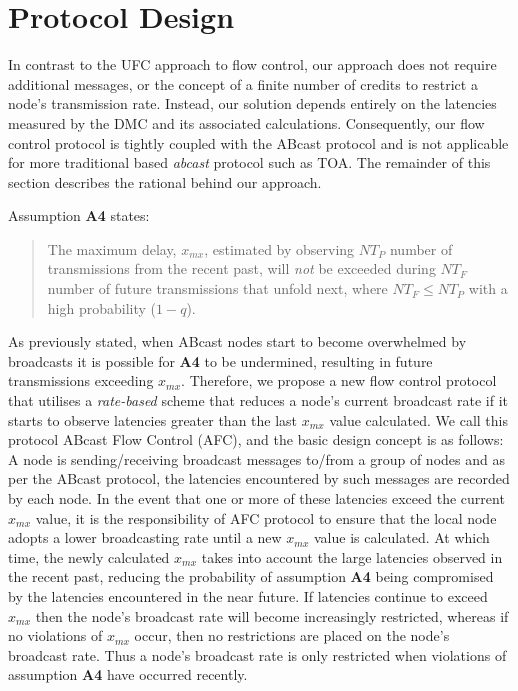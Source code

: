 \section{Protocol Design}\label{sec:afc_protocol}
    In contrast to the \textsf{UFC} approach to flow control, our approach does not require additional messages, or the concept of a finite number of credits to restrict a node's transmission rate.  Instead, our solution depends entirely on the latencies measured by the DMC and its associated calculations.  Consequently, our flow control protocol is tightly coupled with the \textsf{ABcast} protocol and is not applicable for more traditional based \emph{abcast} protocol such as TOA.  The remainder of this section describes the rational behind our approach.  
    
    Assumption \textbf{A4} states:
    
    \begin{quotation}
            The maximum delay, $x_{mx}$, estimated by observing $NT_P$ number of transmissions from the recent past, will \emph{not} be exceeded during $NT_F$ number of future transmissions that unfold next, where $NT_F \leq NT_P$ with a high probability ($1 - q$).
        \end{quotation}
    
    As previously stated, when \textsf{ABcast} nodes start to become overwhelmed by broadcasts it is possible for \textbf{A4} to be undermined, resulting in future transmissions exceeding $x_{mx}$.  Therefore, we propose a new flow control protocol that utilises a \emph{rate-based} scheme \citep{bertsekas1992DataNetworksFC} that reduces a node's current broadcast rate if it starts to observe latencies greater than the last $x_{mx}$ value calculated.  We call this protocol ABcast Flow Control (AFC), and the basic design concept is as follows: A node is sending/receiving broadcast messages to/from a group of nodes and as per the \textsf{ABcast} protocol, the latencies encountered by such messages are recorded by each node.  In the event that one or more of these latencies exceed the current $x_{mx}$ value, it is the responsibility of AFC protocol to ensure that the local node adopts a lower broadcasting rate until a new $x_{mx}$ value is calculated.  At which time, the newly calculated $x_{mx}$ takes into account the large latencies observed in the recent past, reducing the probability of assumption \textbf{A4} being compromised by the latencies encountered in the near future.  If latencies continue to exceed $x_{mx}$ then the node's broadcast rate will become increasingly restricted, whereas if no violations of $x_{mx}$ occur, then no restrictions are placed on the node's broadcast rate. Thus a node's broadcast rate is only restricted when violations of assumption \textbf{A4} have occurred recently.  

